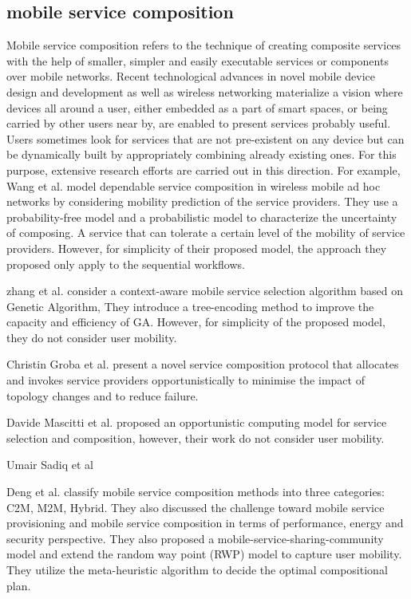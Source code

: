 \documentclass[10pt,journal,compsoc]{IEEEtran}
\begin{document}
\subsection{mobile service composition}
Mobile service composition refers to the technique of creating composite services with the help of smaller, simpler and easily executable services or components over mobile networks. Recent technological advances in novel mobile device design and development as well as wireless networking materialize a vision where devices all around a user, either embedded as a part of smart spaces, or being carried by other users
near by, are enabled to present services probably useful. Users sometimes look for services that are not pre-existent on any device but can be dynamically built by appropriately combining already existing ones. For this purpose, extensive research efforts are carried out in this direction. 
For example, Wang et al. \cite{wang2011exploiting} model dependable service composition in wireless mobile ad hoc networks by considering mobility prediction of the service providers.
They use a probability-free model and a probabilistic model to characterize the uncertainty of composing. A service that can tolerate a certain level of the mobility of service providers. However, for simplicity of their proposed model, the approach they proposed only apply to the sequential workflows.

zhang et al. \cite{Zhang2016qos} consider a context-aware mobile service selection algorithm based on Genetic Algorithm, They introduce a tree-encoding method to improve the capacity and efficiency of GA. However, for simplicity of the proposed model, they do not consider user mobility.

Christin Groba et al. present a novel service composition protocol that allocates and invokes service providers opportunistically to minimise the impact of topology changes and to reduce failure.

Davide Mascitti et al. proposed an opportunistic computing model for service selection and composition, however, their work do not consider user mobility.

Umair Sadiq et al

Deng et al. \cite{Deng2016} classify mobile service composition methods into three categories: C2M, M2M, Hybrid. They also discussed the challenge toward mobile service provisioning and mobile service composition in terms of performance, energy and security perspective. They also proposed a mobile-service-sharing-community model and extend the random way point (RWP) model to capture user mobility. They utilize the meta-heuristic algorithm to decide the optimal compositional plan. 
\end{document}
